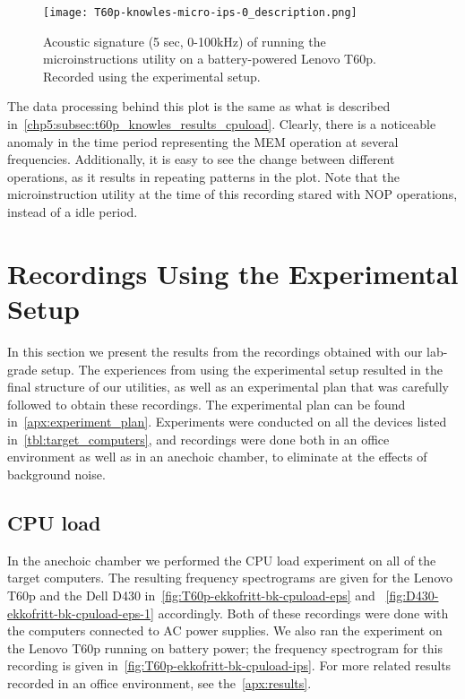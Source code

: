 \begin{figure}[ht]
    \centering
    \texttt{[image: T60p-knowles-micro-ips-0\_description.png]}
    \caption{Acoustic signature (5 sec, 0-100kHz) of running the microinstructions utility on a battery-powered Lenovo T60p.
        Recorded using the experimental setup.}
    \label{fig:T60p-knowles-micro-ips-0}
\end{figure}

The data processing behind this plot is the same as what is described in~\autoref{chp5:subsec:t60p_knowles_results_cpuload}.
Clearly, there is a noticeable anomaly in the time period representing the MEM operation at several frequencies.
Additionally, it is easy to see the change between different operations, as it results in repeating patterns in the plot.
Note that the microinstruction utility at the time of this recording stared with NOP operations, instead of a idle period.



\section{Recordings Using the Experimental Setup}\label{chp5:sec:bk_results}
In this section we present the results from the recordings obtained with our lab-grade setup.
The experiences from using the experimental setup resulted in the final structure of our utilities, as well as an experimental plan that was carefully followed to obtain these recordings.
The experimental plan can be found in~\autoref{apx:experiment_plan}.
Experiments were conducted on all the devices listed in~\autoref{tbl:target_computers}, and recordings were done both in an office environment as well as in an anechoic chamber, to eliminate at the effects of background noise.

\subsection{CPU load}\label{chp5:subsec:t60p_bk_results_cpuload}
In the anechoic chamber we performed the \gls{CPU} load experiment on all of the target computers.
The resulting frequency spectrograms are given for the Lenovo T60p and the Dell D430 in~\autoref{fig:T60p-ekkofritt-bk-cpuload-eps} and ~\autoref{fig:D430-ekkofritt-bk-cpuload-eps-1} accordingly.
Both of these recordings were done with the computers connected to AC power supplies.
We also ran the experiment on the Lenovo T60p running on battery power; the frequency spectrogram for this recording is given in~\autoref{fig:T60p-ekkofritt-bk-cpuload-ips}.
For more related results recorded in an office environment, see the~\autoref{apx:results}.


